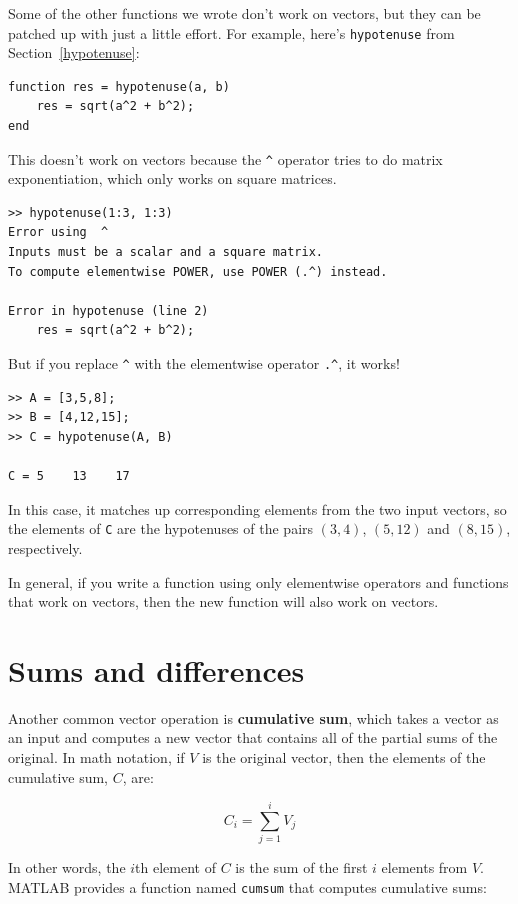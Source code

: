 \documentclass{book}
\begin{document}
Some of the other functions we wrote don't work on vectors,
but they can be patched up with just a little effort.  For example,
here's {\tt hypotenuse} from Section~\ref{hypotenuse}:

\begin{verbatim}
function res = hypotenuse(a, b)
    res = sqrt(a^2 + b^2);
end
\end{verbatim}

This doesn't work on vectors because the \verb+^+ operator
tries to do matrix exponentiation, which only works on
square matrices.

\begin{verbatim}
>> hypotenuse(1:3, 1:3)
Error using  ^ 
Inputs must be a scalar and a square matrix.
To compute elementwise POWER, use POWER (.^) instead.

Error in hypotenuse (line 2)
    res = sqrt(a^2 + b^2);
\end{verbatim}

But if you replace \verb+^+ with the elementwise operator
\verb+.^+, it works!

\begin{verbatim}
>> A = [3,5,8];
>> B = [4,12,15];
>> C = hypotenuse(A, B)

C = 5    13    17
\end{verbatim}
 
In this case, it matches up corresponding elements from the two
input vectors, so the elements of {\tt C} are the hypotenuses of
the pairs $(3,4)$, $(5,12)$ and $(8,15)$, respectively.

In general, if you write a function using only elementwise
operators and functions that work on vectors, then the new
function will also work on vectors.


\section{Sums and differences}

Another common vector operation is {\bf cumulative sum}, which takes a
vector as an input and computes a new vector that contains all of the
partial sums of the original.  In math notation, if $V$ is the
original vector, then the elements of the cumulative sum, $C$, are:

\[ C_i = \sum_{j=1}^i V_j \]

In other words, the $i$th element of $C$ is the sum of the first
$i$ elements from $V$.  MATLAB provides a function named {\tt cumsum}
that computes cumulative sums:
\end{document}
